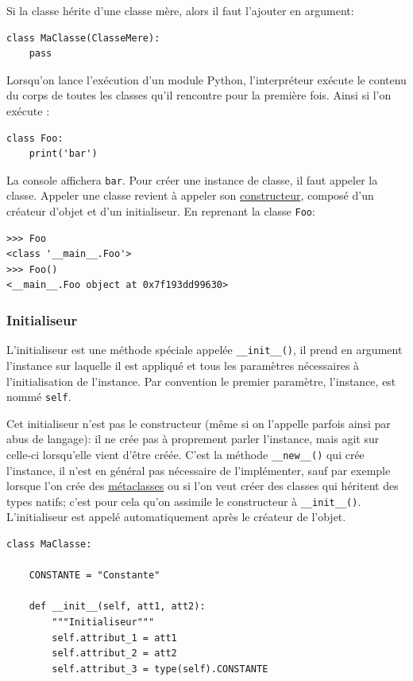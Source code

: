 \documentclass[a4paper, 10pt]{article}
\begin{document}
Si la classe hérite d'une classe mère, alors il faut l'ajouter en argument:
\begin{verbatim}
class MaClasse(ClasseMere):
    pass
\end{verbatim}

Lorsqu'on lance l'exécution d'un module Python, l'interpréteur exécute le contenu du corps de toutes les classes qu'il rencontre pour la première fois. Ainsi si l'on exécute :

\begin{verbatim}
class Foo:
    print('bar')
\end{verbatim}

La console affichera \texttt{bar}. Pour créer une instance de classe, il faut appeler la classe. Appeler une classe revient à appeler son \hyperref[constructeur]{constructeur}, composé d'un créateur d'objet et d'un initialiseur. En reprenant la classe \texttt{Foo}:

\begin{verbatim}
>>> Foo
<class '__main__.Foo'>
>>> Foo()
<__main__.Foo object at 0x7f193dd99630>
\end{verbatim}

\subsubsection{Initialiseur}

L'initialiseur est une méthode spéciale appelée \texttt{__init__()}, il prend en argument l'instance sur laquelle il est appliqué et tous les paramètres nécessaires à l'initialisation de l'instance. Par convention le premier paramètre, l'instance, est nommé \texttt{self}.\bigskip

Cet initialiseur n'est pas le constructeur (même si on l'appelle parfois ainsi par abus de langage): il ne crée  pas à proprement parler l'instance, mais agit sur celle-ci lorsqu'elle vient d'être créée. C'est la méthode \texttt{__new__()} qui crée l'instance, il n'est en général pas nécessaire de l'implémenter, sauf par exemple lorsque l'on crée des \hyperref[sec:metaclasses]{métaclasses} ou si l'on veut créer des classes qui héritent des types natifs; c'est pour cela qu'on assimile le constructeur à \texttt{__init__()}. L'initialiseur est appelé automatiquement après le créateur de l'objet.

\begin{verbatim}
class MaClasse:

    CONSTANTE = "Constante"

    def __init__(self, att1, att2):
        """Initialiseur"""
        self.attribut_1 = att1
        self.attribut_2 = att2
        self.attribut_3 = type(self).CONSTANTE
\end{verbatim}
\end{document}

